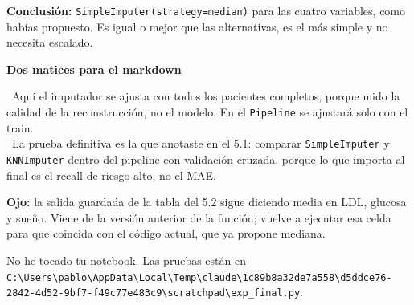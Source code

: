 \documentclass[11pt,a4paper]{article}
\begin{document}
{\textbf{Conclusión:} \texttt{SimpleImputer(strategy=\textquotedbl{}median\textquotedbl{})} para las cuatro variables, como habías propuesto. Es igual o mejor que las alternativas, es el más simple y no necesita escalado.

\smallskip\noindent\textbf{Dos matices para el markdown}\par
\hspace*{1.0em}\textbullet~Aquí el imputador se ajusta con todos los pacientes completos, porque mido la calidad de la reconstrucción, no el modelo. En el \texttt{Pipeline} se ajustará solo con el train. \\{}
\hspace*{1.0em}\textbullet~La prueba definitiva es la que anotaste en el 5.1: comparar \texttt{SimpleImputer} y \texttt{KNNImputer} dentro del pipeline con validación cruzada, porque lo que importa al final es el recall de riesgo alto, no el MAE.

\textbf{Ojo:} la salida guardada de la tabla del 5.2 sigue diciendo \textquotedbl{}media\textquotedbl{} en LDL, glucosa y sueño. Viene de la versión anterior de la función; vuelve a ejecutar esa celda para que coincida con el código actual, que ya propone \textquotedbl{}mediana\textquotedbl{}.

No he tocado tu notebook. Las pruebas están en \texttt{C:\textbackslash\allowbreak{}Users\textbackslash\allowbreak{}pablo\textbackslash\allowbreak{}AppData\textbackslash\allowbreak{}Local\textbackslash\allowbreak{}Temp\textbackslash\allowbreak{}claude\textbackslash\allowbreak{}1c89b8a32de7a558\textbackslash\allowbreak{}d5ddce76-2842-4d52-9bf7-f49c77e483c9\textbackslash\allowbreak{}scratchpad\textbackslash\allowbreak{}exp\_\allowbreak{}final.py}.

}
\end{document}
